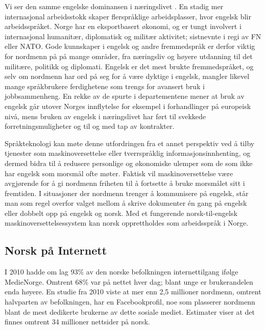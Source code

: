 \begin{multicols}{2}
Vi ser den samme engelske dominansen i næringslivet \cite{SR:2010,Hel:2010}. 
En stadig mer internasjonal arbeidsstokk skaper flerspråklige arbeidsplasser, hvor engelsk blir arbeidsspråket. 
Norge har en eksportbasert økonomi, og er tungt involvert i internasjonal humanitær, diplomatisk og militær aktivitet; sistnevnte i regi av FN eller NATO. 
Gode kunnskaper i engelsk og andre fremmedspråk er derfor viktig for nordmenn på på mange områder, fra næringsliv og høyere utdanning til det militære, politikk og diplomati.  
Engelsk er det mest brukte fremmedspråket, og selv om nordmenn har ord på seg for å være dyktige i engelsk, mangler likevel mange språkbrukere ferdighetene som trengs for avansert bruk i jobbsammenheng. 
En rekke av de spurte i departementene mener at bruk av engelsk går utover Norges innflytelse for eksempel i forhandlinger på europeisk nivå, mens bruken av engelsk i næringslivet har ført til svekkede  forretningsmuligheter og til og med tap av kontrakter. 


Språkteknologi kan møte denne utfordringen fra et annet perspektiv ved å tilby tjenester som maskinoversettelse eller tverrspråklig informasjonsinnhenting, og dermed bidra til å redusere personlige og økonomiske ulemper som de som ikke har engelsk som morsmål ofte møter. 
Faktisk vil maskinoversettelse være avgjørende for å gi nordmenn friheten til å fortsette å bruke morsmålet sitt i fremtiden. 
I situasjoner der nordmenn trenger å kommunisere på engelsk, står man som regel overfor valget mellom å skrive dokumenter én gang på engelsk eller dobbelt opp på engelsk og norsk. 
Med et fungerende norsk-til-engelsk maskinoversettelsessystem kan norsk opprettholdes som arbeidsspråk i Norge.

\subsection{Norsk på Internett}

I 2010 hadde om lag 93\% av den norske befolkningen internettilgang ifølge MedieNorge. 
Omtrent 68\% var på nettet hver dag; blant unge er brukerandelen enda høyere. 
En studie fra 2010 viste at mer enn 2,5 millioner nordmenn, omtrent halvparten av befolkningen, har en Facebookprofil, noe som plasserer nordmenn blant de mest dedikerte brukerne av dette sosiale mediet. 
Estimater viser at det finnes omtrent 34 millioner nettsider på norsk. 


\end{multicols}
